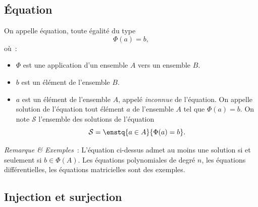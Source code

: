 \subsection{Équation}
\label{chap3-subsec:equation}
\begin{defdef}
  On appelle équation, toute égalité du type
  \begin{equation}
    \Phi(a)=b,
  \end{equation}
  où~:
  \begin{itemize}
  \item $\Phi$ est une application d'un ensemble $A$ vers un ensemble $B$.
  \item $b$ est un élément de l'ensemble $B$.
  \item $a$ est un élément de l'ensemble $A$, appelé \emph{inconnue} de l'équation. On appelle solution de l'équation tout élément $a$ de l'ensemble $A$ tel que $\Phi(a)=b$. On note $\mathcal{S}$ l'ensemble des solutions de l'équation
    \begin{equation}
      \mathcal{S} = \enstq{a \in A}{\Phi(a)=b}.
    \end{equation}
  \end{itemize}
\end{defdef}
\emph{Remarque \& Exemples}~: L'équation ci-dessus admet au moins une solution si et seulement si $b \in \Phi(A)$. Les équations polynomiales de degré $n$, les équations différentielles, les équations matricielles sont des exemples.
%
\subsection{Injection et surjection}
\label{chap3-subsec:injetsurj}
